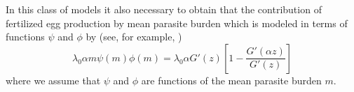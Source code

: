 \documentclass[12pt,a4paper]{article}
\theoremstyle{plain}%
\theoremstyle{definition}
\theoremstyle{remark}
\begin{document}
	In this class of models it also necessary to obtain that the contribution of fertilized egg production by mean parasite burden which is modeled  in
	terms of functions $\psi$ and $\phi$ by (see, for example,  \citep{anderson1992infectious})
	\begin{equation}
	\lambda_0\alpha m \psi(m) \phi(m)= \lambda_0 \alpha G'(z) \left[1-\frac{ G'(\alpha z)}{G'(z)}\right] 	
	\end{equation}
	where we assume that $\psi$ and $\phi$ are functions of the mean parasite burden $m$.  
%	
		
	
%	
	
\end{document}
